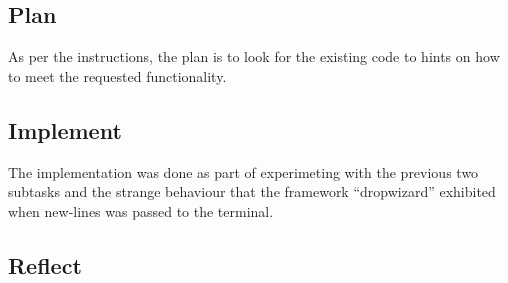 \subsection{Plan}\label{task-1c-plan}
As per the instructions, the plan is to look for the existing code to hints
on how to meet the requested functionality.

\subsection{Implement}\label{task-1c-implement}
The implementation was done as part of experimeting with the previous two
subtasks and the strange behaviour that the framework ``dropwizard'' exhibited
when new-lines was passed to the terminal.

\subsection{Reflect}\label{task-1c-reflect}
